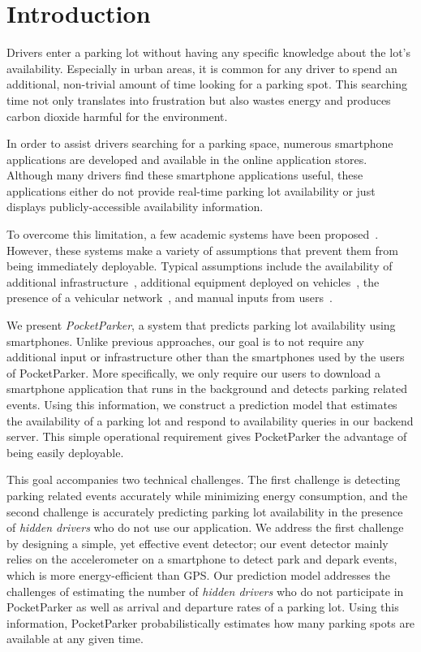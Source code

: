 \section{Introduction}

Drivers enter a parking lot without having any specific knowledge about the
lot's availability. Especially in urban areas, it is common for any driver to
spend an additional, non-trivial amount of time looking for a parking spot. This
searching time not only translates into frustration but also wastes energy and
produces carbon dioxide harmful for the environment.

In order to assist drivers searching for a parking space, numerous smartphone
applications are developed and available in the online application stores.
Although many drivers find these smartphone applications useful, these
applications either do not provide real-time parking lot availability or
just displays publicly-accessible availability information. 

To overcome this limitation, a few academic systems have been
proposed~\cite{4212497, Chen:2012:COS, Delot:2009:CRP, 5062057,
Mathur:2010:PDS}. However, these systems make a variety of assumptions that
prevent them from being immediately deployable. Typical assumptions include the
availability of additional infrastructure~\cite{5062057}, additional equipment
deployed on vehicles~\cite{Mathur:2010:PDS}, the presence of a vehicular
network~\cite{Delot:2009:CRP, Mathur:2010:PDS, 4212497}, and manual inputs from
users~\cite{Chen:2012:COS}.

We present {\it PocketParker}, a system that predicts parking lot availability
using smartphones. Unlike previous approaches, our goal is to not require any
additional input or infrastructure other than the smartphones used by the users
of PocketParker. More specifically, we only require our users to download a
smartphone application that runs in the background and detects parking related
events. Using this information, we construct a prediction model that estimates
the availability of a parking lot and respond to availability queries in our
backend server. This simple operational requirement gives PocketParker the
advantage of being easily deployable.

This goal accompanies two technical challenges. The first challenge is detecting
parking related events accurately while minimizing energy consumption, and the
second challenge is accurately predicting parking lot availability in the
presence of {\it hidden drivers} who do not use our application. We address the
first challenge by designing a simple, yet effective event detector; our event
detector mainly relies on the accelerometer on a smartphone to detect park and
depark events, which is more energy-efficient than GPS. Our prediction model
addresses the challenges of estimating the number of {\it hidden drivers} who do
not participate in PocketParker as well as arrival and departure rates of a
parking lot. Using this information, PocketParker probabilistically estimates
how many parking spots are available at any given time.

